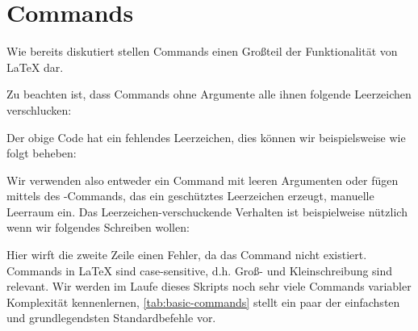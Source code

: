 \section{Commands}
Wie bereits diskutiert stellen Commands einen Großteil der Funktionalität von \LaTeX{} dar.
Zu beachten ist, dass Commands ohne Argumente alle ihnen folgende Leerzeichen verschlucken:
Der obige Code hat ein fehlendes Leerzeichen, dies können wir beispielsweise wie folgt beheben:
Wir verwenden also entweder ein Command mit leeren Argumenten oder fügen mittels des \latexcommand{ }-Commands, das ein geschütztes Leerzeichen erzeugt, manuelle Leerraum ein.
Das Leerzeichen-verschuckende Verhalten ist beispielweise nützlich wenn wir folgendes Schreiben wollen:
Hier wirft die zweite Zeile einen Fehler, da das Command  nicht existiert.
Commands in \LaTeX{} sind case-sensitive, d.h. Groß- und Kleinschreibung sind relevant.
Wir werden im Laufe dieses Skripts noch sehr viele Commands variabler Komplexität kennenlernen, \autoref{tab:basic-commands} stellt ein paar der einfachsten und grundlegendsten Standardbefehle vor.


